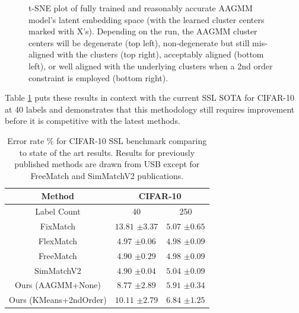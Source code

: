 \documentclass[10pt,twocolumn,letterpaper]{article}
\begin{document}
\begin{figure}[h]
	\caption{t-SNE plot of fully trained and reasonably accurate AAGMM model's latent embedding space (with the learned cluster centers marked with X's). Depending on the run, the AAGMM cluster centers will be degenerate (top left), non-degenerate but still mis-aligned with the clusters (top right), acceptably aligned (bottom left), or well aligned with the underlying clusters when a 2nd order constraint is employed (bottom right).} 
	\label{fig:cifar10tsneaagmmnone}
\end{figure}


Table \ref{sslcifar10} puts these results in context with the current SSL SOTA for CIFAR-10 at 40 labels and demonstrates that this methodology still requires improvement before it is competitive with the latest methods. 

\begin{table}[htbp]
	\begin{tabular}{c|cc}
		Method          & \multicolumn{2}{c}{CIFAR-10} \\ \hline
		Label Count     & 40            & 250           \\
		\hline
		FixMatch\cite{sohn2020fixmatch}   & $13.81$ \scriptsize{$\pm3.37$}   & $5.07$ \scriptsize{$\pm0.65$}     \\
		FlexMatch\cite{zhang2021flexmatch}  & $4.97$ \scriptsize{$\pm0.06$}    & $4.98$ \scriptsize{$\pm0.09$}    \\
		FreeMatch\cite{wang2022freematch}  & $4.90$ \scriptsize{$\pm0.29$}    & $4.98$ \scriptsize{$\pm0.09$}    \\
		SimMatchV2\cite{zheng2023simmatchv2} & $4.90$ \scriptsize{$\pm0.04$}    & $5.04$ \scriptsize{$\pm0.09$}    \\ \hline
		Ours (AAGMM+None)    & $8.77$ \scriptsize{$\pm 2.89$}           & $5.91$ \scriptsize{$\pm 0.34$}  \\
		Ours (KMeans+2ndOrder)    & $10.11$ \scriptsize{$\pm 2.79$}           & $6.84$ \scriptsize{$\pm 1.25$}  
		
	\end{tabular}
	\caption{Error rate \% for CIFAR-10 SSL benchmark comparing to state of the art results. Results for previously published methods are drawn from USB \cite{wang2022usb} except for FreeMatch \cite{wang2022freematch} and SimMatchV2 \cite{zheng2023simmatchv2} publications.}
	\label{sslcifar10}
\end{table}
\end{document}
